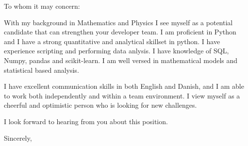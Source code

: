 \documentclass[10pt,a4paper]{letter}
\begin{document}
\begin{letter}{}
\opening{To whom it may concern:}

With my background in Mathematics and Physics I see myself as a potential candidate that can strengthen your developer team. I am proficient in Python and I have a strong quantitative and analytical skillset in python. I have experience scripting and performing data anlysis. I have knowledge of SQL, Numpy, pandas and scikit-learn. I am well versed in mathematical models and statistical based analysis.  
 
I have excellent communication skills in both English and Danish, and I am able to work both independently and within a team environment. I view myself as a cheerful and optimistic person who is looking for new challenges.

I look forward to hearing from you about this position.   

\closing{Sincerely,}

\end{letter}

\end{document}
